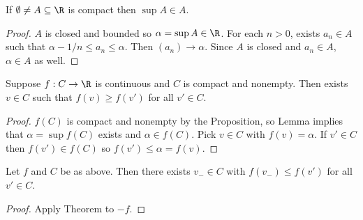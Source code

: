 \documentclass[a4paper]{article}
\theoremstyle{definition}
\begin{document}
\begin{application}
 \begin{lemma}
  If \(\emptyset \neq A \subseteq \R \) is compact then \(\sup A \in A\).
\end{lemma}

\begin{proof}
  \(A\) is closed and bounded so \(\alpha = \sup A\in \R\). For each \(n>0\), exists \(a_n \in A\) such that \(\alpha-1/n \leq a_n \leq \alpha\). Then \((a_n)\to \alpha\). Since \(A\) is closed and \(a_n \in A\), \(\alpha\in A\) as well.
\end{proof}
 
\begin{theorem}
  Suppose \(f:C\to \R\)  is continuous and \(C\) is compact and nonempty. Then exists \(v\in C\) such that \(f(v) \geq f(v')\) for all \(v' \in C\).
\end{theorem}

\begin{proof}
  \(f(C)\) is compact and nonempty by the Proposition, so Lemma implies that \(\alpha = \sup f(C)\) exists and \(\alpha\in f(C)\). Pick \(v\in C\) with \(f(v) = \alpha\). If \(v'\in C\) then \(f(v') \in f(C)\) so \(f(v') \leq \alpha = f(v)\).
\end{proof}

\begin{corollary}
  Let \(f\) and \(C\) be as above. Then there exists \(v_-\in C\) with \(f(v_-) \leq f(v')\) for all \(v' \in C\).
\end{corollary}

\begin{proof}
  Apply Theorem to \(-f\).
\end{proof}
\end{application}
\end{document}
